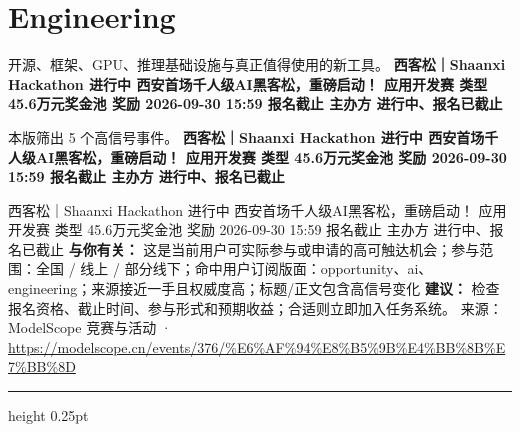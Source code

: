 \documentclass[10.5pt]{ctexart}
\begin{document}
\section*{Engineering}
{\color{ormuted} 开源、框架、GPU、推理基础设施与真正值得使用的新工具。}
\vspace{2mm}
{\LARGE\bfseries 西客松｜Shaanxi Hackathon 进行中 西安首场千人级AI黑客松，重磅启动！ 应用开发赛 类型 45.6万元奖金池 奖励 2026-09-30 15:59 报名截止 主办方 进行中、报名已截止}\par
\vspace{1mm}
{\color{ormuted} 本版筛出 5 个高信号事件。}
\vspace{3mm}
{\Large\bfseries 西客松｜Shaanxi Hackathon 进行中 西安首场千人级AI黑客松，重磅启动！ 应用开发赛 类型 45.6万元奖金池 奖励 2026-09-30 15:59 报名截止 主办方 进行中、报名已截止}\par
西客松｜Shaanxi Hackathon 进行中 西安首场千人级AI黑客松，重磅启动！ 应用开发赛 类型 45.6万元奖金池 奖励 2026-09-30 15:59 报名截止 主办方 进行中、报名已截止
\textbf{与你有关：} 这是当前用户可实际参与或申请的高可触达机会；参与范围：全国 / 线上 / 部分线下；命中用户订阅版面：opportunity、ai、engineering；来源接近一手且权威度高；标题/正文包含高信号变化
\textbf{建议：} 检查报名资格、截止时间、参与形式和预期收益；合适则立即加入任务系统。
{\footnotesize\color{ormuted} 来源：ModelScope 竞赛与活动 · \url{https://modelscope.cn/events/376/%E6%AF%94%E8%B5%9B%E4%BB%8B%E7%BB%8D}}
\vspace{4mm}
\hrule height 0.25pt
\vspace{3mm}
\end{document}
